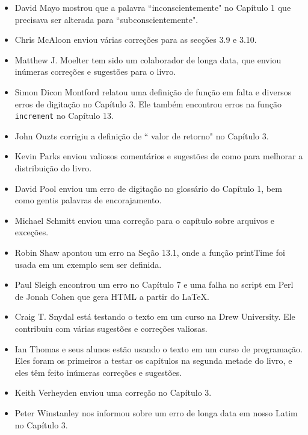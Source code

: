 \documentclass[10pt]{book}
\begin{document}
\begin {itemize}
\item David Mayo mostrou que a palavra ``inconscientemente"
no Capítulo 1 que precisava
ser alterada para ``subconscientemente".

\item Chris McAloon enviou várias correções para as secções 3.9 e
3.10.

\item Matthew J. Moelter tem sido um colaborador de longa data, que enviou
inúmeras correções e sugestões para o livro.  

\item Simon Dicon Montford relatou uma definição de função em falta e
diversos erros de digitação no Capítulo 3. Ele também encontrou erros na
função {\tt increment} no Capítulo 13.

\item John Ouzts corrigiu a definição de `` valor de retorno"
no Capítulo 3.

\item Kevin Parks enviou valiosos comentários e sugestões de como
para melhorar a distribuição do livro.

\item David Pool enviou um erro de digitação no glossário do Capítulo 1, bem como
gentis palavras de encorajamento.

\item Michael Schmitt enviou uma correção para o capítulo sobre arquivos
e exceções.

\item Robin Shaw apontou um erro na Seção 13.1, onde a
função printTime foi usada em um exemplo sem ser definida.

\item Paul Sleigh encontrou um erro no Capítulo 7 e uma falha
no script em Perl de Jonah Cohen que gera HTML a partir do \LaTeX.

\item Craig T. Snydal está testando o texto em um curso na Drew
University. Ele contribuiu com várias sugestões e correções valiosas.

\item Ian Thomas e seus alunos estão usando o texto em um curso de
programação. Eles foram os primeiros a testar os capítulos na segunda metade
do livro, e eles têm feito inúmeras correções e sugestões.

\item Keith Verheyden enviou uma correção no Capítulo 3.

\item Peter Winstanley nos informou sobre um erro de longa data em
nosso Latim no Capítulo 3.


\end{itemize}
\end{document}
